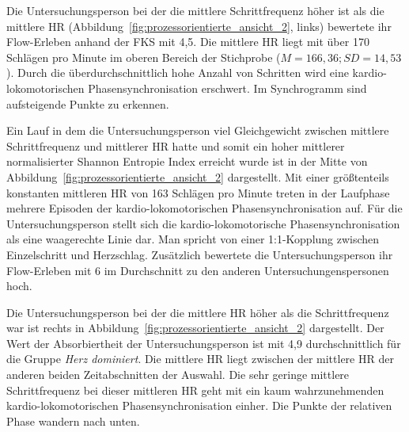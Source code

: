 Die Untersuchungsperson bei der die mittlere Schrittfrequenz höher ist als die mittlere \ac{HR} (Abbildung~\ref{fig:prozessorientierte_ansicht_2}, links) bewertete ihr Flow-Erleben anhand der \ac{FKS} mit 4,5. Die mittlere \ac{HR} liegt mit über 170 Schlägen pro Minute im oberen Bereich der Stichprobe ($M = 166{,}36; SD = 14{,}53$). Durch die überdurchschnittlich hohe Anzahl von Schritten wird eine kardio-lokomotorischen Phasensynchronisation erschwert. Im Synchrogramm sind aufsteigende Punkte zu erkennen.

\begin{sidewaysfigure}
	
	\caption{Eine Minute Daten einer Untersuchungsperson der Gruppe Schritt dominiert (links), einer Untersuchungsperson Geleichgewicht (mitte) und einer Untersuchungsperson der Gruppe Herz dominert (rechts). \emph{Anmerkung}: Rel. Phase = Relative Phase.}
	\label{fig:prozessorientierte_ansicht_2}
\end{sidewaysfigure}

Ein Lauf in dem die Untersuchungsperson viel Gleichgewicht zwischen mittlere Schrittfrequenz und mittlerer HR hatte und somit ein hoher mittlerer normalisierter Shannon Entropie Index erreicht wurde ist in der Mitte von Abbildung~\ref{fig:prozessorientierte_ansicht_2} dargestellt. Mit einer größtenteils konstanten mittleren \ac{HR} von 163 Schlägen pro Minute treten in der Laufphase mehrere Episoden der kardio-lokomotorischen Phasensynchronisation auf. Für die Untersuchungsperson stellt sich die kardio-lokomotorische Phasensynchronisation als eine waagerechte Linie dar. Man spricht von einer 1:1-Kopplung zwischen Einzelschritt und Herzschlag. Zusätzlich bewertete die Untersuchungsperson ihr Flow-Erleben mit 6 im Durchschnitt zu den anderen Untersuchungenspersonen hoch. 

Die Untersuchungsperson bei der die mittlere \ac{HR} höher als die Schrittfrequenz war ist rechts in Abbildung~\ref{fig:prozessorientierte_ansicht_2} dargestellt. Der Wert der Absorbiertheit der Untersuchungsperson ist mit 4,9 durchschnittlich für die Gruppe \emph{Herz dominiert}. Die mittlere \ac{HR} liegt zwischen der mittlere \ac{HR} der anderen beiden Zeitabschnitten der Auswahl. Die sehr geringe mittlere Schrittfrequenz bei dieser mittleren \ac{HR} geht mit ein kaum wahrzunehmenden kardio-lokomotorischen Phasensynchronisation einher. Die Punkte der relativen Phase wandern nach unten. 


